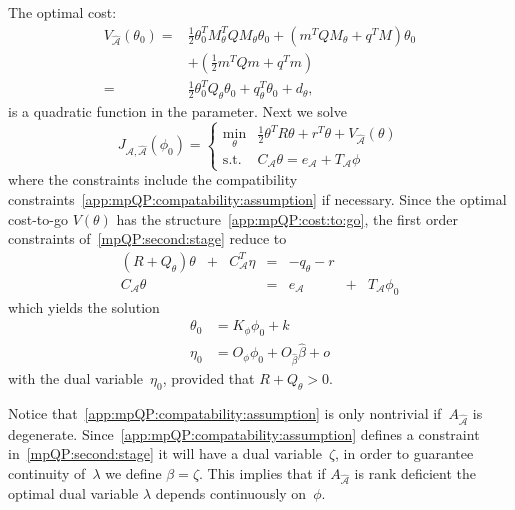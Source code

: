 \documentclass[journal]{IEEEtran}
\theoremstyle{remark}
\theoremstyle{definition}
\begin{document}
The optimal cost:
%
\begin{equation}\label{app:mpQP:cost:to:go}\begin{split}
  V_{\hat{\mathcal A}}(\theta_0) = &\frac{1}{2}\theta^T_0 M_\theta^T Q M_\theta \theta_0 + \left(m^TQM_\theta + q^TM\right) \theta_0\\ 
  &+\left( \frac{1}{2} m^T Q m + q^T m\right)\\
  =&\frac{1}{2} \theta^T_0 Q_\theta \theta_0 + q^T_\theta \theta_0 + d_\theta,
\end{split}\end{equation}
%
is a quadratic function in the parameter.
%
Next we solve
%
\begin{equation}\label{mpQP:second:stage}
  J_{\mathcal A,\hat{\mathcal A}}(\phi_0) = \left\{\begin{array}{rl}
  \min_\theta & \frac{1}{2}\theta^TR\theta + r^T\theta + V_{\hat{\mathcal A}}(\theta)\\
  \text{s.t.} & C_{\mathcal A}\theta = e_{\mathcal A} + T_{\mathcal A} \phi
  \end{array}\right.
\end{equation}
%
where the constraints include the compatibility constraints~\eqref{app:mpQP:compatability:assumption} if necessary. 
%
Since the optimal cost-to-go $V(\theta)$ has the structure~\eqref{app:mpQP:cost:to:go},
the first order constraints of~\eqref{mpQP:second:stage} reduce to
%
\begin{equation}\label{mpQP:second:stage:conditions}
  \begin{array}{ccccccc}
    (R + Q_\theta)\theta &+& C^T_{{\mathcal A}}\eta & = & -q_\theta-r && \\
    C_{{\mathcal A}} \theta & & & = & e_{{\mathcal A}}& +& T_{{\mathcal A}}\phi_0
  \end{array}
\end{equation}
%
which yields the solution
%
\begin{equation}
  \begin{split}
  \theta_0 &= K_\phi \phi_0 + k\\
  \eta_0 &= O_\phi \phi_0 + O_{\hat\beta} \hat\beta + o
  \end{split}
\end{equation}
%
with the dual variable~$\eta_0$, provided that $R+Q_\theta>0$.

Notice that~\eqref{app:mpQP:compatability:assumption} is only nontrivial if~$A_{\hat{\mathcal A}}$ is degenerate.
%
Since~\eqref{app:mpQP:compatability:assumption} defines a constraint in~\eqref{mpQP:second:stage} it will have a dual
variable~$\zeta$, in order to guarantee continuity of~$\lambda$ we define $\beta=\zeta$.
%
This implies that if $A_{\hat{\mathcal A}}$ is rank deficient the optimal dual variable $\lambda$
depends continuously on~$\phi$.
%
\end{document}
